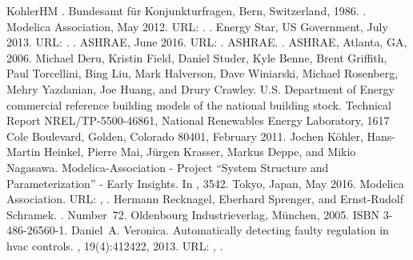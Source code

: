 \documentclass[letterpaper,10pt, openany,english]{sphinxmanual}
\begin{document}
\begin{sphinxthebibliography}{KohlerHM}
. Bundesamt für Konjunkturfragen, Bern, Switzerland, 1986.
. Modelica Association, May 2012. URL: .
. Energy Star, US Government, July 2013. URL: .
. ASHRAE, June 2016. URL: .
ASHRAE. . ASHRAE, Atlanta, GA, 2006.
Michael Deru, Kristin Field, Daniel Studer, Kyle Benne, Brent Griffith, Paul Torcellini, Bing Liu, Mark Halverson, Dave Winiarski, Michael Rosenberg, Mehry Yazdanian, Joe Huang, and Drury Crawley. U.S. Department of Energy commercial reference building models of the national building stock. Technical Report NREL/TP-5500-46861, National Renewables Energy Laboratory, 1617 Cole Boulevard, Golden, Colorado 80401, February 2011.
Jochen Köhler, Hans-Martin Heinkel, Pierre Mai, Jürgen Krasser, Markus Deppe, and Mikio Nagasawa. Modelica-Association - Project “System Structure and Parameterization” - Early Insights. In , 35\textendash{}42. Tokyo, Japan, May 2016. Modelica Association. URL: , .
Hermann Recknagel, Eberhard Sprenger, and Ernst-Rudolf Schramek. . Number 72. Oldenbourg Industrieverlag, München, 2005. ISBN 3-486-26560-1.
Daniel A. Veronica. Automatically detecting faulty regulation in hvac controls. , 19(4):412\textendash{}422, 2013. URL: , .

\end{sphinxthebibliography}
\end{document}
